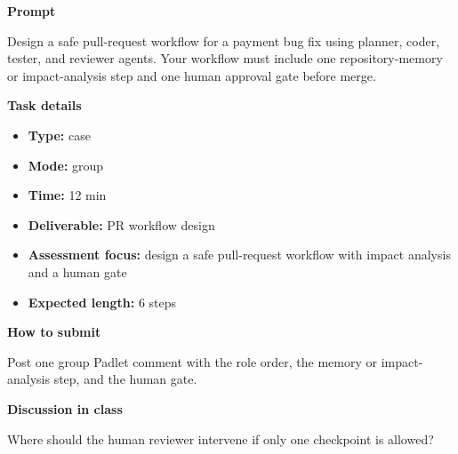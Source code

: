\documentclass[11pt]{article}
\begin{document}
\begin{tcolorbox}[colback=white,colframe=MidnightBlue,title={Q4 Collaborative Mini-Case},fonttitle=\bfseries,breakable]
\begin{center}
\end{center}

{\large\bfseries\color{MidnightBlue} Prompt}\par\medskip
Design a safe pull-request workflow for a payment bug fix using planner, coder, tester, and reviewer agents. Your workflow must include one repository-memory or impact-analysis step and one human approval gate before merge.

{\large\bfseries\color{MidnightBlue} Task details}\par\medskip
\begin{itemize}\item \textbf{Type:} case
\item \textbf{Mode:} group
\item \textbf{Time:} 12 min
\item \textbf{Deliverable:} PR workflow design
\item \textbf{Assessment focus:} design a safe pull-request workflow with impact analysis and a human gate
\item \textbf{Expected length:} 6 steps\end{itemize}

{\large\bfseries\color{MidnightBlue} How to submit}\par\medskip
Post one group Padlet comment with the role order, the memory or impact-analysis step, and the human gate.

{\large\bfseries\color{MidnightBlue} Discussion in class}\par\medskip
Where should the human reviewer intervene if only one checkpoint is allowed?


\end{tcolorbox}
\end{document}
